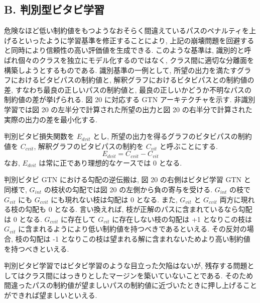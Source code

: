 \documentclass[twocolumn]{jarticle}     %
\begin{document}
\subsection*{B. 判別型ビタビ学習}
危険なほど低い制約値をもつようなおそらく間違えているパスのペナルティを上げるといったように学習基準を修正することにより, 上記の崩壊問題を回避すると同時により信頼性の高い評価値を生成できる. このような基準は, 識別的と呼ばれ個々のクラスを独立にモデル化するのではなく, クラス間に適切な分離面を構築しようとするものである. 識別基準の一例として, 所望の出力を満たすグラフにおけるビタビパスの制約値と, 解釈グラフにおけるビタビパスとの制約値の差, すなわち最良の正しいパスの制約値と, 最良の正しいかどうか不明なパスの制約値の差が挙げられる. 図 20 に対応する GTN アーキテクチャを示す. 非識別学習では図 20 の左半分で計算された所望の出力と図 20 の右半分で計算された実際の出力の差を最小化する.
\par
判別ビタビ損失関数を $E_{dvit}$ とし, 所望の出力を得るグラフのビタビパスの制約値を $C_{cvit}$, 解釈グラフのビタビパスの制約を $C_{vit}$ と呼ぶことにする.
\begin{equation}
  E_{dvit} = C_{cvit} - C_{vit}
\end{equation} 
なお, $E_{dvit}$ は常に正であり理想的なケースでは 0 となる. 
\par
判別ビタビ GTN における勾配の逆伝搬は, 図 20 の右側はビタビ学習 GTN と同様で, $G_{int}$ の枝状の勾配では図 20 の左側から負の寄与を受ける. $G_{int}$ の枝で $G_{vit}$ にも $G_{cvit}$ にも現れない枝は勾配は 0 となる. また, $G_{vit}$ と $G_{cvit}$ 両方に現れる枝の勾配も 0 となる. 言い換えれば, 枝が正解のパスに含まれているなら勾配は 0 となる. $G_{cvit}$ に存在して $G_{vit}$ に存在しない枝の勾配は +1 となりこの枝は $G_{vit}$ に含まれるようにより低い制約値を持つべきであるといえる.
その反対の場合, 枝の勾配は -1 となりこの枝は望まれる解に含まれないためより高い制約値を持つべきといえる. 
\par
判別ビタビ学習ではビタビ学習のような目立った欠陥はないが, 残存する問題としてはクラス間にはっきりとしたマージンを築いていないことである. そのため間違ったパスの制約値が望ましいパスの制約値に近づいたときに押し上げることができれば望ましいといえる.
\end{document}
